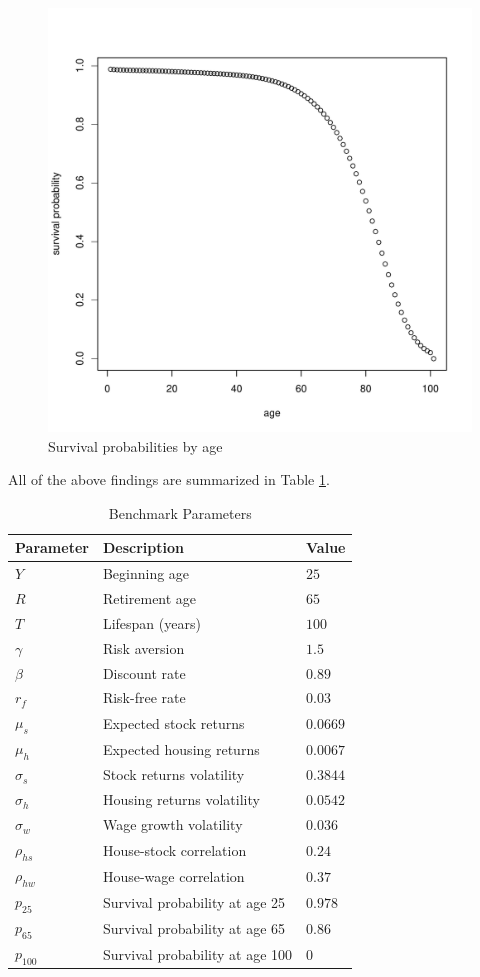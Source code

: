 \begin{figure}[h!]
	\centering
	\includegraphics[scale=0.3]{figs/survival.pdf}
	\caption{Survival probabilities by age}
	\label{fig:surv}
\end{figure}

All of the above findings are summarized in Table \ref{table:default}. 

\begin{table}[h!]
	\centering
	\caption{Benchmark Parameters}
	\label{table:default}
	\begin{tabular}[c]{lll}
		\hline
		Parameter&Description&Value\\
		\hline
		$Y$&Beginning age&$25$\\
		$R$&Retirement age&$65$\\
		$T$&Lifespan (years)&$100$\\
		$\gamma$&Risk aversion&$1.5$\\
		$\beta$&Discount rate&$0.89$\\
		$r_f$&Risk-free rate&$0.03$\\
		\hline
		$\mu_s$&Expected stock returns&$0.0669$\\
		$\mu_h$&Expected housing returns&$0.0067$\\
		$\sigma_s$&Stock returns volatility&$0.3844$\\
		$\sigma_h$&Housing returns volatility&$0.0542$\\
		$\sigma_w$&Wage growth volatility&$0.036$\\
		$\rho_{hs}$&House-stock correlation&$0.24$\\
		$\rho_{hw}$&House-wage correlation&$0.37$\\
		\hline
		$p_{25}$&Survival probability at age 25&$0.978$\\
		$p_{65}$&Survival probability at age 65&$0.86$\\
		$p_{100}$&Survival probability at age 100&$0$\\	
		\hline
	\end{tabular}
\end{table}


